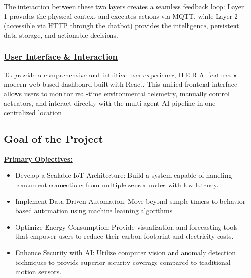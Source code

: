 The interaction between these two layers creates a seamless feedback loop: Layer 1 provides the physical context and executes actions via MQTT, while Layer 2 (accessible via HTTP through the chatbot) provides the intelligence, persistent data storage, and actionable decisions.

\subsubsection*{\underline{User Interface \& Interaction}}
To provide a comprehensive and intuitive user experience, H.E.R.A. features a modern web-based dashboard built with React. This unified frontend interface allows users to monitor real-time environmental telemetry, manually control actuators, and interact directly with the multi-agent AI pipeline in one centralized location



\subsection{Goal of the Project}

\underline{\textbf{Primary Objectives:}}
\begin{itemize}
  \item Develop a Scalable IoT Architecture: Build a system capable of handling concurrent connections from multiple sensor nodes with low latency.
  \item Implement Data-Driven Automation: Move beyond simple timers to behavior-based automation using machine learning algorithms.
  \item Optimize Energy Consumption: Provide visualization and forecasting tools that empower users to reduce their carbon footprint and electricity costs.
  \item Enhance Security with AI: Utilize computer vision and anomaly detection techniques to provide superior security coverage compared to traditional motion sensors.
\end{itemize}

